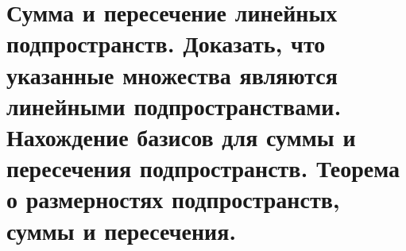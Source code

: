 \section{
    Сумма и пересечение линейных подпространств. Доказать, что указанные множества являются линейными подпространствами. Нахождение базисов для суммы и пересечения подпространств. Теорема о размерностях подпространств, суммы и пересечения.
}




\newpage





\newpage




\newpage



